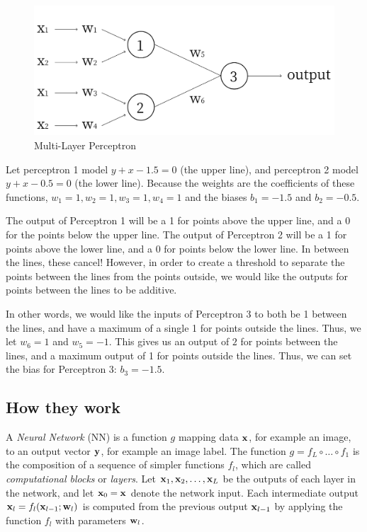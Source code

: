 \begin{figure}[H]
	\centering
	\includegraphics[scale=0.3]{images/Frame}
	\caption{Multi-Layer Perceptron}
	\label{f:Frame}
\end{figure}

Let perceptron 1 model $y + x - 1.5 = 0$ (the upper line), and perceptron 2 model $y + x - 0.5 = 0$ (the lower line). Because the weights are the coefficients of these functions, $w_1 = 1, w_2 = 1, w_3 = 1, w_4 = 1$ and the biases $b_1 = -1.5$ and $b_2 = -0.5$.

The output of Perceptron 1 will be a 1 for points above the upper line, and a 0 for the points below the upper line. The output of Perceptron 2 will be a 1 for points above the lower line, and a 0 for points below the lower line. In between the lines, these cancel! However, in order to create a threshold to separate the points between the lines from the points outside, we would like the outputs for points between the lines to be additive.

In other words, we would like the inputs of Perceptron 3 to both be 1 between the lines, and have a maximum of a single 1 for points outside the lines. Thus, we let $w_6 = 1$ and $w_5 = -1$. This gives us an output of $2$ for points between the lines, and a maximum output of 1 for points outside the lines. Thus, we can set the bias for Perceptron 3: $b_3 = -1.5$.


\subsection{How they work}\label{s:cnn-structure}

A \emph{Neural Network} (NN) is a function $g$ mapping data $\mathbf{x}$, for example an image, to an output vector $\mathbf{y}$, for example an image label. The function $g=f_L \circ \dots \circ f_1$ is the composition of a sequence of simpler functions $f_l$, which are called \emph{computational blocks} or \emph{layers}. Let $\mathbf{x}_1,\mathbf{x}_2,\dots,\mathbf{x}_L$ be the outputs of each layer in the network, and let $\mathbf{x}_0=\mathbf{x}$ denote the network input. Each intermediate output $\mathbf{x}_l = f_l(\mathbf{x}_{l-1};\mathbf{w}_l)$ is computed from the previous output $\mathbf{x}_{l-1}$  by applying the function $f_l$ with parameters $\mathbf{w}_l$. 

